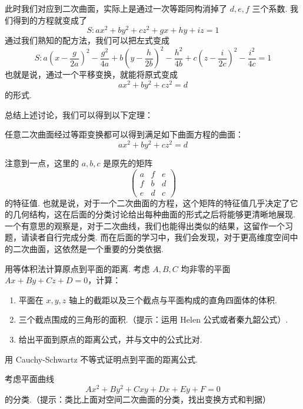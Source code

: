 此时我们对应到二次曲面，实际上是通过一次等距同构消掉了 $d, e, f$ 三个系数. 我们得到的方程就变成了
\[
S: ax^2 + by^2 + cz^2 + g x + h y + i z = 1
\]
通过我们熟知的配方法，我们可以把左式变成
\[
S: a(x - \frac{g}{2a})^2 - \frac{g^2}{4a} + b(y - \frac{h}{2b})^2 - \frac{h^2}{4b} + c(z - \frac{i}{2c})^2 - \frac{i^2}{4c} = 1
\]
也就是说，通过一个平移变换，就能将原式变成
\[
a x^2 + b y^2 + c z^2 = d
\]
的形式.

总结上述讨论，我们可以得到以下定理：

\begin{theorem}{}{}
    任意二次曲面经过等距变换都可以得到满足如下曲面方程的曲面：
    \[
    a x^2 + b y^2 + c z^2 = d
    \]
\end{theorem}

注意到一点，这里的 $a, b, c$ 是原先的矩阵
\[
\begin{pmatrix}
    a & f & e \\
    f & b & d \\
    e & d & c
\end{pmatrix}
\]
的特征值. 也就是说，对于一个二次曲面的方程，这个矩阵的特征值几乎决定了它的几何结构，这在后面的分类讨论给出每种曲面的形式之后将能够更清晰地展现. 一个有意思的观察是，对于二次曲线，我们也能得出类似的结果，这留作一个习题，请读者自行完成分类. 而在后面的学习中，我们会发现，对于更高维度空间中的二次曲面，这依然是一个重要的分类依据.

\begin{summary}

\end{summary}

\begin{exercise}

    \begin{exgroup}
        \item 用等体积法计算原点到平面的距离. 考虑 $A, B, C$ 均非零的平面 $A x + B y + C z + D = 0$，计算：
        \begin{enumerate}
            \item 平面在 $x, y, z$ 轴上的截距以及三个截点与平面构成的直角四面体的体积.
            \item 三个截点围成的三角形的面积.（提示：运用 Helen 公式或者秦九韶公式）.
            \item 给出平面到原点的距离公式，并与文中的公式比对.
        \end{enumerate}

        \item 用 Cauchy-Schwartz 不等式证明点到平面的距离公式.
    \end{exgroup}

    \begin{exgroup}
        \item 考虑平面曲线 \[A x^2 + B y^2 + C x y + D x + E y + F = 0\] 的分类.（提示：类比上面对空间二次曲面的分类，找出变换方式和判据）
    \end{exgroup}

    \begin{exgroup}
        \item
    \end{exgroup}
\end{exercise}
